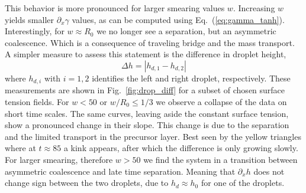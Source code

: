 \documentclass[twocolumn,amsmath,amssymb,showpacs,pre,nofootinbib,superscriptaddress]{revtex4-1} %
\begin{document}
This behavior is more pronounced for larger smearing values $w$.
Increasing $w$ yields smaller $\partial_x\gamma$ values, as can be computed using Eq.~(\ref{eq:gamma_tanh}). 
Interestingly, for $w\approx R_0$ we no longer see a separation, but an asymmetric coalescence.
Which is a consequence of traveling bridge and the mass transport.
A simpler measure to assess this statement is the difference in droplet height,
\begin{equation}\label{eq:drop_diff_h}
    \Delta h = |h_{d,1} - h_{d,2}|
\end{equation}
where $h_{d,i}$ with $i=1,2$ identifies the left and right droplet, respectively.
These measurements are shown in Fig.~\ref{fig:drop_diff} for a subset of chosen surface tension fields.
For $w < 50$ or $w/R_0 \le 1/3$ we observe a collapse of the data on short time scales.
The same curves, leaving aside the constant surface tension, show a pronounced change in their slope.
This change is due to the separation and the limited transport in the precursor layer.
Best seen by the yellow triangles where at $t \approx 85$ a kink appears, after which the difference is only growing slowly.
For larger smearing, therefore $w > 50$ we find the system in a transition between asymmetric coalescence and late time separation.
Meaning that $\partial_x h$ does not change sign between the two droplets, due to $h_d \approx h_0$ for one of the droplets. 
\end{document}
